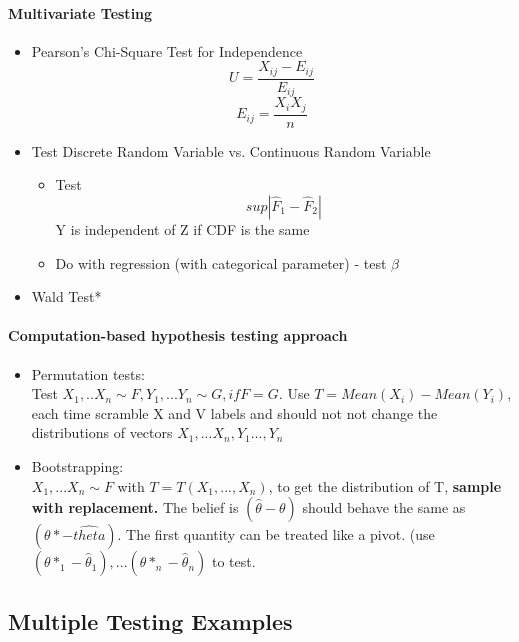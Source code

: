 \documentclass[11pt, openany]{book}              %
\begin{document}
\paragraph{Multivariate Testing}

\begin{itemize}
	\item Pearson's Chi-Square Test for Independence 
		$$ U = \frac{X_{ij} - E_{ij}}{E_{ij}}$$
		$$ E_{ij} = \frac{X_iX_j}{n}$$
	\item Test Discrete Random Variable vs. Continuous Random Variable
		\begin{itemize}
			\item Test $$sup|\hat{F}_1 - \hat{F}_2|$$ Y is independent of Z if CDF is the same
			\item Do with regression (with categorical parameter) - test $\beta$
		\end{itemize}
	\item Wald Test*
\end{itemize}


\paragraph{Computation-based hypothesis testing approach}

\begin{itemize}
    \item Permutation tests: \\ Test $X_1,..X_n \sim F, Y_1,...Y_n \sim G, if F=G$. Use $T = Mean(X_i )- Mean(Y_i)$, each time scramble X and V labels and should not not change the distributions of vectors $X_1,...X_n, Y_1...,Y_n$
    \item Bootstrapping: \\ $X_1,...X_n \sim F$ with $T = T(X_1,...,X_n)$, to get the distribution of T, \textbf{sample with replacement.} The belief is $(\hat{\theta} - \theta)$ should behave the same as $(\theta* - \hat{theta})$. The first quantity can be treated like a pivot.  (use $(\theta*_1 - \hat{\theta}_1),...(\theta*_n - \hat{\theta}_n)$ to test. 
\end{itemize}

\subsection{Multiple Testing Examples}
\end{document}
